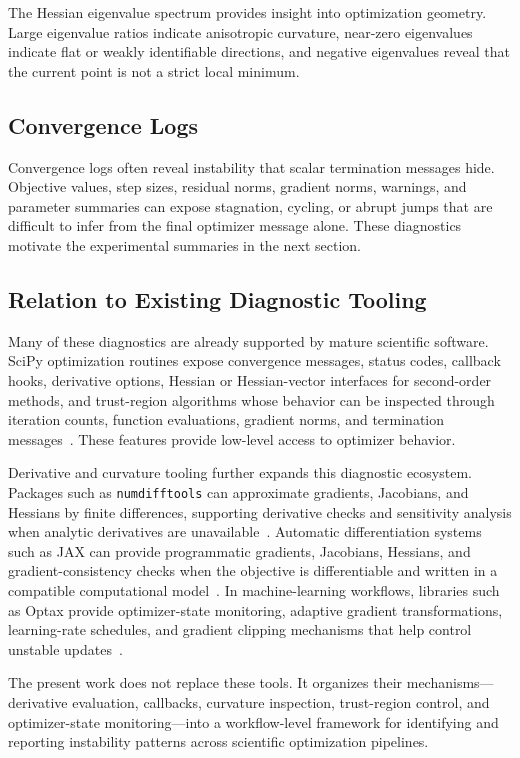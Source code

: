 The Hessian eigenvalue spectrum provides insight into optimization geometry. Large eigenvalue ratios indicate anisotropic curvature, near-zero eigenvalues indicate flat or weakly identifiable directions, and negative eigenvalues reveal that the current point is not a strict local minimum.

\subsection{Convergence Logs}

Convergence logs often reveal instability that scalar termination messages hide. Objective values, step sizes, residual norms, gradient norms, warnings, and parameter summaries can expose stagnation, cycling, or abrupt jumps that are difficult to infer from the final optimizer message alone. These diagnostics motivate the experimental summaries in the next section.

\subsection{Relation to Existing Diagnostic Tooling}

Many of these diagnostics are already supported by mature scientific software. SciPy optimization routines expose convergence messages, status codes, callback hooks, derivative options, Hessian or Hessian-vector interfaces for second-order methods, and trust-region algorithms whose behavior can be inspected through iteration counts, function evaluations, gradient norms, and termination messages~\citep{scipy}. These features provide low-level access to optimizer behavior.

Derivative and curvature tooling further expands this diagnostic ecosystem. Packages such as \texttt{numdifftools} can approximate gradients, Jacobians, and Hessians by finite differences, supporting derivative checks and sensitivity analysis when analytic derivatives are unavailable~\citep{numdifftools}. Automatic differentiation systems such as JAX can provide programmatic gradients, Jacobians, Hessians, and gradient-consistency checks when the objective is differentiable and written in a compatible computational model~\citep{jax}. In machine-learning workflows, libraries such as Optax provide optimizer-state monitoring, adaptive gradient transformations, learning-rate schedules, and gradient clipping mechanisms that help control unstable updates~\citep{optax}.

The present work does not replace these tools. It organizes their mechanisms---derivative evaluation, callbacks, curvature inspection, trust-region control, and optimizer-state monitoring---into a workflow-level framework for identifying and reporting instability patterns across scientific optimization pipelines.


